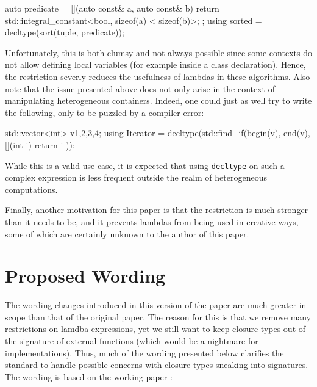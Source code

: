 \documentclass[11pt]{article}
\newcommand{\cc}[1]{\texttt{#1}}
\begin{document}
\begin{cpp}
auto predicate = [](auto const& a, auto const& b) {
  return std::integral_constant<bool, sizeof(a) < sizeof(b)>{};
};
using sorted = decltype(sort(tuple, predicate));
\end{cpp}

Unfortunately, this is both clumsy and not always possible since some contexts
do not allow defining local variables (for example inside a class declaration).
Hence, the restriction severly reduces the usefulness of lambdas in these algorithms.
Also note that the issue presented above does not only arise in the context of
manipulating heterogeneous containers. Indeed, one could just as well try to
write the following, only to be puzzled by a compiler error:

\begin{cpp}
std::vector<int> v{1,2,3,4};
using Iterator = decltype(std::find_if(begin(v), end(v), [](int i) {
  return i %
}));
\end{cpp}

While this is a valid use case, it is expected that using \cc{decltype} on
such a complex expression is less frequent outside the realm of heterogeneous
computations.

Finally, another motivation for this paper is that the restriction is much stronger
than it needs to be, and it prevents lambdas from being used in creative ways,
some of which are certainly unknown to the author of this paper.


\section{Proposed Wording}
The wording changes introduced in this version of the paper are much greater in
scope than that of the original paper. The reason for this is that we remove
many restrictions on lamdba expressions, yet we still want to keep closure types
out of the signature of external functions (which would be a nightmare for
implementations). Thus, much of the wording presented below clarifies the
standard to handle possible concerns with closure types sneaking into signatures.
The wording is based on the working paper \cite{N4606}:
\end{document}
